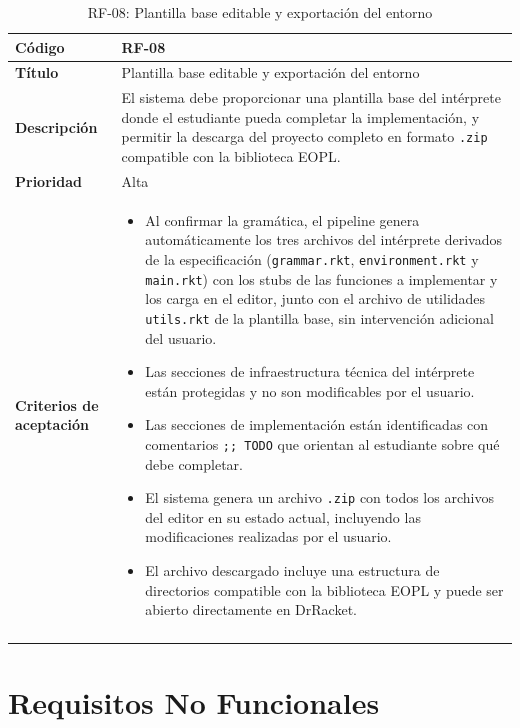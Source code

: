 \begin{longtable}{|>{\bfseries}p{3cm}|p{11cm}|}
\hline
\textbf{Código} & RF-08 \\
\hline
\textbf{Título} & Plantilla base editable y exportación del entorno \\
\hline
\textbf{Descripción} & El sistema debe proporcionar una plantilla base del intérprete donde el estudiante pueda completar la implementación, y permitir la descarga del proyecto completo en formato \texttt{.zip} compatible con la biblioteca EOPL. \\
\hline
\textbf{Prioridad} & Alta \\
\hline
\textbf{Criterios de aceptación} &
\begin{itemize}[leftmargin=*,topsep=2pt,itemsep=1pt,parsep=0pt]
    \item Al confirmar la gramática, el pipeline genera automáticamente los tres archivos del intérprete derivados de la especificación (\texttt{grammar.rkt}, \texttt{environment.rkt} y \texttt{main.rkt}) con los stubs de las funciones a implementar y los carga en el editor, junto con el archivo de utilidades \texttt{utils.rkt} de la plantilla base, sin intervención adicional del usuario.
    \item Las secciones de infraestructura técnica del intérprete están protegidas y no son modificables por el usuario.
    \item Las secciones de implementación están identificadas con comentarios \texttt{;; TODO} que orientan al estudiante sobre qué debe completar.
    \item El sistema genera un archivo \texttt{.zip} con todos los archivos del editor en su estado actual, incluyendo las modificaciones realizadas por el usuario.
    \item El archivo descargado incluye una estructura de directorios compatible con la biblioteca EOPL y puede ser abierto directamente en DrRacket.
\end{itemize} \\
\hline
\caption{RF-08: Plantilla base editable y exportación del entorno}
\label{tab:rf08}
\end{longtable}

\section{Requisitos No Funcionales}


